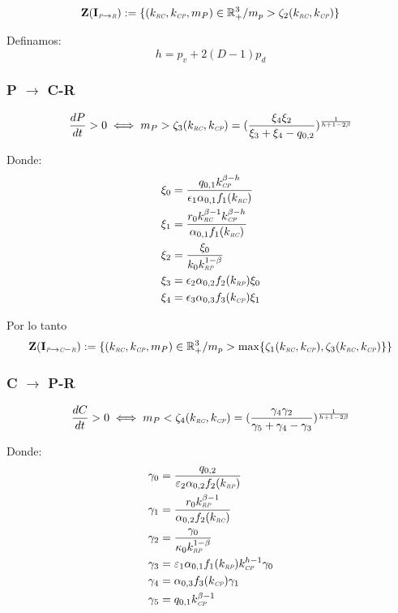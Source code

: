 \begin{equation}
\mathbf{Z(I_{\textit{\tiny P} \to \textit{\tiny R}})} := \{ (k_{\textit{\tiny RC}},k_{\textit{\tiny CP}},m_P) \in \mathbb{R}^3_+ / m_p > \zeta_2(k_{\textit{\tiny RC}},k_{\textit{\tiny CP}}) \}
\end{equation}


Definamos:
\begin{equation}
  h = p_v + 2(D-1)p_d
\end{equation}

\subsubsection{P $\to$ C-R}
\begin{equation}
  \frac{dP}{dt}  >0 \iff m_P > \zeta_3(k_{\textit{\tiny RC}},k_{\textit{\tiny CP}}) = (\frac{\xi_4\xi_2}{\xi_3 + \xi_4 - q_{0,2}})^{\frac{1}{h + 1 - 2\beta}}
\end{equation}

Donde:
\begin{equation}
  \begin{aligned}
    \xi_0 &= \frac{q_{0,1} k_{\textit{\tiny CP}}^{\beta - h}}{\epsilon_1 \alpha_{0,1} f_1(k_{\textit{\tiny RC}})}\\
    \xi_1 &= \frac{r_0 k_{\textit{\tiny RC}}^{\beta -1}k_{\textit{\tiny CP}}^{\beta-h}}{\alpha_{0,1} f_1(k_{\textit{\tiny RC}})}\\
    \xi_2 &= \frac{\xi_0}{k_0 k_{\textit{\tiny RP}}^{1-\beta}} \\
    \xi_3 &= \epsilon_2 \alpha_{0,2} f_2(k_{\textit{\tiny RP}}) \xi_0\\
    \xi_4 &=\epsilon_3 \alpha_{0,3} f_3(k_{\textit{\tiny CP}}) \xi_1
  \end{aligned}
\end{equation}


Por lo tanto 
\begin{equation}
\mathbf{Z(I_{\textit{\tiny P} \to \textit{\tiny C}-\textit{\tiny R}})} := \{ (k_{\textit{\tiny RC}},k_{\textit{\tiny CP}},m_P) \in \mathbb{R}^3_+ / m_p > \max\{\zeta_1(k_{\textit{\tiny RC}},k_{\textit{\tiny CP}}),\zeta_3(k_{\textit{\tiny RC}},k_{\textit{\tiny CP}})\} \}
\end{equation}
\subsubsection{C $\to$ P-R}
\begin{equation}
  \frac{dC}{dt}  >0 \iff m_P < \zeta_4(k_{\textit{\tiny RC}},k_{\textit{\tiny CP}}) = (\frac{\gamma_4\gamma_2}{\gamma_5 + \gamma_4 - \gamma_3})^{\frac{1}{h + 1 - 2\beta}}
\end{equation}

Donde:
\begin{equation}
  \begin{aligned}
    \gamma_0 &= \frac{q_{0,2}}{\varepsilon_2 \alpha_{0,2} f_2(k_{\textit{\tiny RP}})}\\
    \gamma_1 &= \frac{r_0 k_{\textit{\tiny RP}}^{\beta -1}}{\alpha_{0,2} f_2(k_{\textit{\tiny RC}})}\\
    \gamma_2 &= \frac{\gamma_0}{\kappa_0 k_{\textit{\tiny RP}}^{1-\beta}} \\
    \gamma_3 &= \varepsilon_1\alpha_{0,1} f_1(k_{\textit{\tiny RP}}) k_{\textit{\tiny CP}}^{h -1} \gamma_0\\
    \gamma_4 &=\alpha_{0,3} f_3(k_{\textit{\tiny CP}}) \gamma_1 \\
    \gamma_5 &= q_{0,1} k_{\textit{\tiny CP}}^{\beta-1}
  \end{aligned}
\end{equation}

